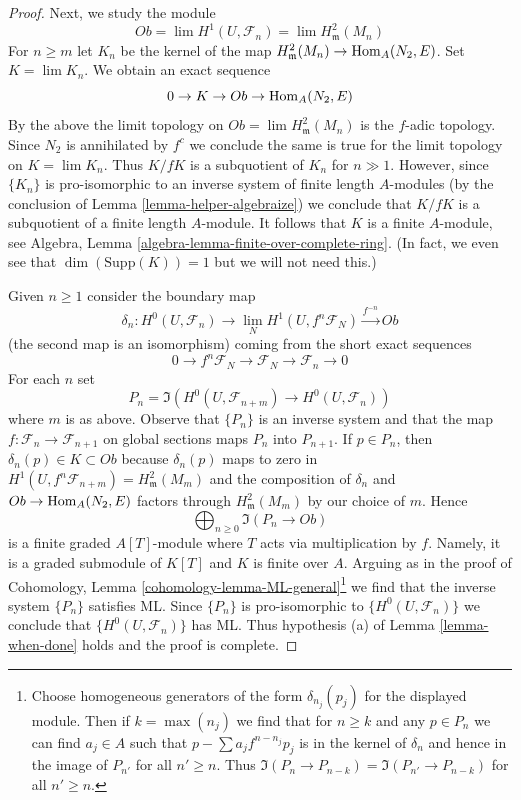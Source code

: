 \begin{proof}
\medskip\noindent
Next, we study the module
$$
Ob = \lim H^1(U, \mathcal{F}_n) = \lim H^2_\mathfrak m(M_n)
$$
For $n \geq m$ let $K_n$ be the kernel of the map
$H^2_\mathfrak m(M_n) \to \mathop{\mathrm{Hom}}\nolimits_A(N_2, E)$.
Set $K = \lim K_n$. We obtain an exact sequence
$$
0 \to K \to Ob \to \mathop{\mathrm{Hom}}\nolimits_A(N_2, E)
$$
By the above the limit topology on $Ob = \lim H^2_\mathfrak m(M_n)$
is the $f$-adic topology. Since $N_2$ is annihilated by $f^c$
we conclude the same is true for the limit topology on $K = \lim K_n$.
Thus $K/fK$ is a subquotient of $K_n$ for $n \gg 1$.
However, since $\{K_n\}$ is pro-isomorphic to an inverse system of
finite length $A$-modules (by the conclusion of
Lemma \ref{lemma-helper-algebraize})
we conclude that $K/fK$ is a subquotient of a finite length
$A$-module. It follows that $K$ is a finite $A$-module, see
Algebra, Lemma \ref{algebra-lemma-finite-over-complete-ring}.
(In fact, we even see that $\dim(\text{Supp}(K)) = 1$ but
we will not need this.)

\medskip\noindent
Given $n \geq 1$ consider the boundary map
$$
\delta_n :
H^0(U, \mathcal{F}_n)
\longrightarrow
\lim_N H^1(U, f^n\mathcal{F}_N) \xrightarrow{f^{-n}} Ob
$$
(the second map is an isomorphism)
coming from the short exact sequences
$$
0 \to f^n\mathcal{F}_N \to \mathcal{F}_N \to \mathcal{F}_n \to 0
$$
For each $n$ set
$$
P_n = \Im(H^0(U, \mathcal{F}_{n + m}) \to H^0(U, \mathcal{F}_n))
$$
where $m$ is as above. Observe that $\{P_n\}$ is an inverse
system and that the map $f : \mathcal{F}_n \to \mathcal{F}_{n + 1}$
on global sections maps $P_n$ into $P_{n + 1}$.
If $p \in P_n$, then $\delta_n(p) \in K \subset Ob$
because $\delta_n(p)$ maps to zero in
$H^1(U, f^n\mathcal{F}_{n + m}) = H^2_\mathfrak m(M_m)$
and the composition of $\delta_n$ and $Ob \to \mathop{\mathrm{Hom}}\nolimits_A(N_2, E)$
factors through $H^2_\mathfrak m(M_m)$ by our choice of $m$.
Hence
$$
\bigoplus\nolimits_{n \geq 0} \Im(P_n \to Ob)
$$
is a finite graded $A[T]$-module where $T$ acts via multiplication by $f$.
Namely, it is a graded submodule of $K[T]$ and $K$ is finite over $A$.
Arguing as in the proof of
Cohomology, Lemma \ref{cohomology-lemma-ML-general}\footnote{Choose
homogeneous generators of the form $\delta_{n_j}(p_j)$ for the displayed
module. Then if $k = \max(n_j)$ we find that for $n \geq k$
and any $p \in P_n$ we can find $a_j \in A$ such that
$p - \sum a_j f^{n - n_j} p_j$ is in the kernel of $\delta_n$
and hence in the image of $P_{n'}$ for all $n' \geq n$.
Thus $\Im(P_n \to P_{n - k}) = \Im(P_{n'} \to P_{n - k})$
for all $n' \geq n$.}
we find that the inverse system $\{P_n\}$ satisfies ML.
Since $\{P_n\}$ is pro-isomorphic to $\{H^0(U, \mathcal{F}_n)\}$
we conclude that $\{H^0(U, \mathcal{F}_n)\}$ has ML.
Thus hypothesis (a) of Lemma \ref{lemma-when-done}
holds and the proof is complete.
\end{proof}

